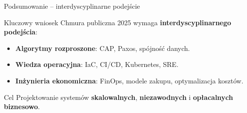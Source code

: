 \documentclass[aspectratio=169]{beamer}
\begin{document}
\begin{frame}{Podsumowanie – interdyscyplinarne podejście}
    \begin{block}{Kluczowy wniosek}
        Chmura publiczna 2025 wymaga \textbf{interdyscyplinarnego podejścia}:
    \end{block}
    \begin{itemize}
        \item \textbf{Algorytmy rozproszone}: CAP, Paxos, spójność danych.
        \item \textbf{Wiedza operacyjna}: IaC, CI/CD, Kubernetes, SRE.
        \item \textbf{Inżynieria ekonomiczna}: FinOps, modele zakupu, optymalizacja kosztów.
    \end{itemize}
    \begin{exampleblock}{Cel}
        Projektowanie systemów \textbf{skalowalnych}, \textbf{niezawodnych} i \textbf{opłacalnych biznesowo}.
    \end{exampleblock}
\end{frame}
\end{document}
